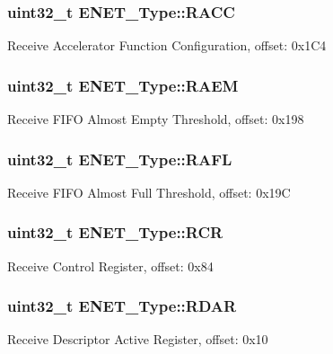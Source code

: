 \subsubsection[{\texorpdfstring{R\+A\+CC}{RACC}}]{ uint32\+\_\+t E\+N\+E\+T\+\_\+\+Type\+::\+R\+A\+CC}\hypertarget{structENET__Type_a2f86336404b15e64e1dac59d0a5a6270}{}\label{structENET__Type_a2f86336404b15e64e1dac59d0a5a6270}
Receive Accelerator Function Configuration, offset\+: 0x1\+C4 
\subsubsection[{\texorpdfstring{R\+A\+EM}{RAEM}}]{ uint32\+\_\+t E\+N\+E\+T\+\_\+\+Type\+::\+R\+A\+EM}\hypertarget{structENET__Type_a4847e5abf286cd40f1473ea96b7c1e5f}{}\label{structENET__Type_a4847e5abf286cd40f1473ea96b7c1e5f}
Receive F\+I\+FO Almost Empty Threshold, offset\+: 0x198 
\subsubsection[{\texorpdfstring{R\+A\+FL}{RAFL}}]{ uint32\+\_\+t E\+N\+E\+T\+\_\+\+Type\+::\+R\+A\+FL}\hypertarget{structENET__Type_a0d267bf8a33801197a472cdaa463e9ef}{}\label{structENET__Type_a0d267bf8a33801197a472cdaa463e9ef}
Receive F\+I\+FO Almost Full Threshold, offset\+: 0x19C 
\subsubsection[{\texorpdfstring{R\+CR}{RCR}}]{ uint32\+\_\+t E\+N\+E\+T\+\_\+\+Type\+::\+R\+CR}\hypertarget{structENET__Type_a1e6a24a342870195d9f9efd0ed7a43bc}{}\label{structENET__Type_a1e6a24a342870195d9f9efd0ed7a43bc}
Receive Control Register, offset\+: 0x84 
\subsubsection[{\texorpdfstring{R\+D\+AR}{RDAR}}]{ uint32\+\_\+t E\+N\+E\+T\+\_\+\+Type\+::\+R\+D\+AR}\hypertarget{structENET__Type_aafd4d2fcc9b52fe5e9fb671cb3cbe8f7}{}\label{structENET__Type_aafd4d2fcc9b52fe5e9fb671cb3cbe8f7}
Receive Descriptor Active Register, offset\+: 0x10 
